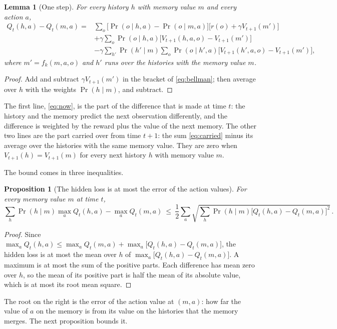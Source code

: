\documentclass[11pt]{article}
\newtheorem{proposition}{Proposition}
\newtheorem{lemma}{Lemma}
\theoremstyle{definition}
\begin{document}
\begin{lemma}[One step]\label{lem:onestep}
For every history $h$ with memory value $m$ and every action $a$,
\begin{align}
Q_t(h,a)-Q_t(m,a)={}&\sum_o\big[\Pr(o\mid h,a)-\Pr(o\mid m,a)\big]\big[r(o)+\gamma V_{t+1}(m')\big] \label{eq:now}\\
&+\gamma\sum_o\Pr(o\mid h,a)\big[V_{t+1}(h,a,o)-V_{t+1}(m')\big] \label{eq:carried}\\
&-\gamma\sum_{h'}\Pr(h'\mid m)\sum_o\Pr(o\mid h',a)\big[V_{t+1}(h',a,o)-V_{t+1}(m')\big], \nonumber
\end{align}
where $m'=f_k(m,a,o)$ and $h'$ runs over the histories with the memory value $m$.
\end{lemma}
\begin{proof}
Add and subtract $\gamma V_{t+1}(m')$ in the bracket of \eqref{eq:bellman}; then average over $h$ with the weights $\Pr(h\mid m)$, and subtract.
\end{proof}

The first line, \eqref{eq:now}, is the part of the difference that is made at time $t$: the history and the memory predict the next observation differently, and the difference is weighted by the reward plus the value of the next memory. The other two lines are the part carried over from time $t+1$: the sum \eqref{eq:carried} minus its average over the histories with the same memory value. They are zero when $V_{t+1}(h)=V_{t+1}(m)$ for every next history $h$ with memory value $m$.

The bound comes in three inequalities.

\begin{proposition}[The hidden loss is at most the error of the action values]\label{prop:terms}
For every memory value $m$ at time $t$,
\[
\sum_h\Pr(h\mid m)\max_aQ_t(h,a)-\max_aQ_t(m,a)\ \le\ \frac12\sum_a\sqrt{\sum_h\Pr(h\mid m)\big[Q_t(h,a)-Q_t(m,a)\big]^2}\,.
\]
\end{proposition}
\begin{proof}
Since $\max_aQ_t(h,a)\le\max_aQ_t(m,a)+\max_a\big[Q_t(h,a)-Q_t(m,a)\big]$, the hidden loss is at most the mean over $h$ of $\max_a\big[Q_t(h,a)-Q_t(m,a)\big]$. A maximum is at most the sum of the positive parts. Each difference has mean zero over $h$, so the mean of its positive part is half the mean of its absolute value, which is at most its root mean square.
\end{proof}

The root on the right is the error of the action value at $(m,a)$: how far the value of $a$ on the memory is from its value on the histories that the memory merges. The next proposition bounds it.
\end{document}
